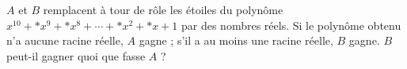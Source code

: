 $A$ et $B$ remplacent à tour de rôle les étoiles du polynôme $x^{10} + {*}x^9 + {*}x^8 + \cdots + {*}x^2 + {*}x + 1$ par des nombres réels. Si le polynôme obtenu n'a aucune racine réelle, $A$ gagne ; s'il a au moins une racine réelle, $B$ gagne. $B$ peut-il gagner quoi que fasse $A$ ?
